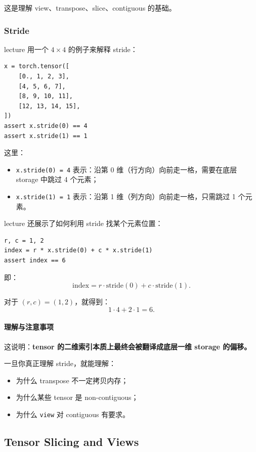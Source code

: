 \documentclass[a4paper,UTF8]{article}
\numberwithin{equation}{section}
\begin{document}
这是理解 view、transpose、slice、contiguous 的基础。

\subsubsection{Stride}

lecture 用一个 \(4 \times 4\) 的例子来解释 stride：
\begin{verbatim}
x = torch.tensor([
    [0., 1, 2, 3],
    [4, 5, 6, 7],
    [8, 9, 10, 11],
    [12, 13, 14, 15],
])
assert x.stride(0) == 4
assert x.stride(1) == 1
\end{verbatim}

这里：
\begin{itemize}
    \item \verb|x.stride(0) = 4| 表示：沿第 0 维（行方向）向前走一格，需要在底层 storage 中跳过 4 个元素；
    \item \verb|x.stride(1) = 1| 表示：沿第 1 维（列方向）向前走一格，只需跳过 1 个元素。
\end{itemize}

lecture 还展示了如何利用 stride 找某个元素位置：
\begin{verbatim}
r, c = 1, 2
index = r * x.stride(0) + c * x.stride(1)
assert index == 6
\end{verbatim}

即：
\[
\text{index} = r \cdot \text{stride}(0) + c \cdot \text{stride}(1).
\]

对于 \((r,c) = (1,2)\)，就得到：
\[
1 \cdot 4 + 2 \cdot 1 = 6.
\]

\paragraph{理解与注意事项}
这说明：\textbf{tensor 的二维索引本质上最终会被翻译成底层一维 storage 的偏移。}

一旦你真正理解 stride，就能理解：
\begin{itemize}
    \item 为什么 transpose 不一定拷贝内存；
    \item 为什么某些 tensor 是 non-contiguous；
    \item 为什么 \verb|view| 对 contiguous 有要求。
\end{itemize}

\subsection{Tensor Slicing and Views}
\end{document}
